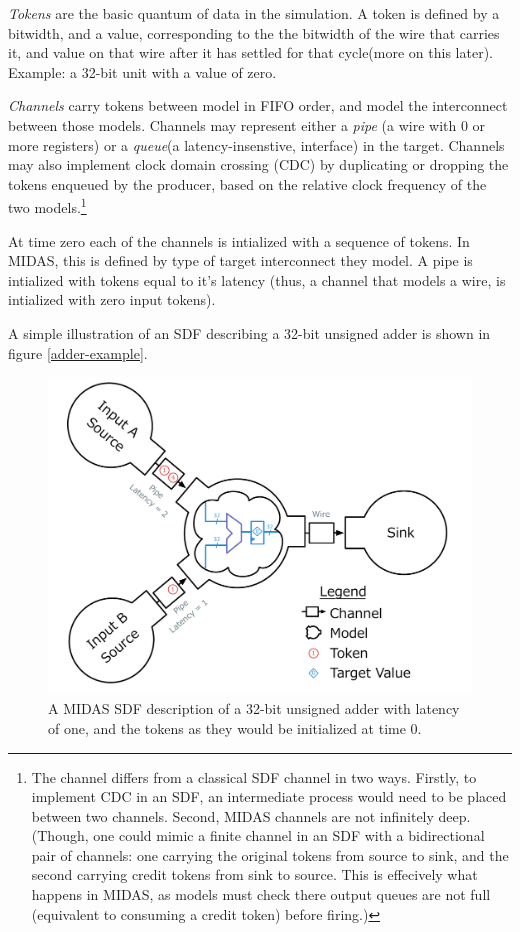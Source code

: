 \emph{Tokens} are the basic quantum of data in the simulation. A token is
defined by a bitwidth, and a value, corresponding to the the bitwidth of the
wire that carries it, and value on that wire after it has settled for that
cycle(more on this later). Example: a 32-bit unit with a value of zero.

\emph{Channels} carry tokens between model in FIFO order, and model the
interconnect between those models. Channels may represent either a \emph{pipe}
(a wire with 0 or more registers) or a \emph{queue}(a latency-insenstive,
interface) in the target. Channels may also implement clock domain crossing
(CDC) by duplicating or dropping the tokens enqueued by the producer, based on
the relative clock frequency of the two models.\footnote{The channel differs
from a classical SDF channel in two ways. Firstly, to implement CDC in an SDF,
an intermediate process would need to be placed between two channels.  Second,
MIDAS channels are not infinitely deep. (Though, one could mimic a finite
channel in an SDF with a bidirectional pair of channels: one carrying the
original tokens from source to sink, and the second carrying credit tokens from
sink to source. This is effecively what happens in MIDAS, as models must check
there output queues are not full (equivalent to consuming a credit token)
before firing.)}

At time zero each of the channels is intialized with a sequence of tokens. In
MIDAS, this is defined by type of target interconnect they model.  A pipe is
intialized with tokens equal to it's latency (thus, a channel that models a
wire, is intialized with zero input tokens).

A simple illustration of an SDF describing a 32-bit unsigned adder is shown
in figure \ref{adder-example}.

\begin{figure}
	\centering
	\includegraphics[width=16cm]{figures/adder-example.pdf}
	\caption{A MIDAS SDF description of a 32-bit unsigned adder with latency of one, and the tokens as they would be initialized at time 0.}
	\label{fig:adder-example}
\end{figure}

